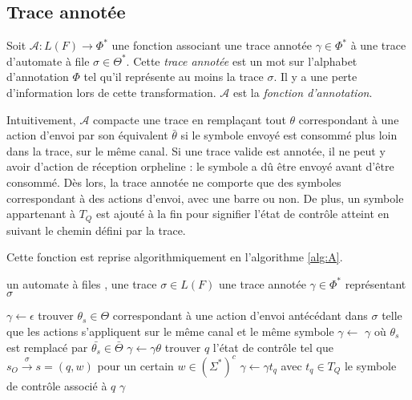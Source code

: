 
\subsection{Trace annotée}\label{trace:annot}

Soit $\mathcal{A}:L(F)\rightarrow\Phi^*$ une fonction associant une trace annotée $\gamma\in\Phi^*$ à une trace d'automate à file $\sigma\in\Theta^*$. Cette \emph{trace annotée} est un mot sur l'alphabet d'annotation $\Phi$ tel qu'il représente au moins la trace $\sigma$. Il y a une perte d'information lors de cette transformation. $\mathcal{A}$ est la \emph{fonction d'annotation}.

Intuitivement, $\mathcal{A}$ compacte une trace en remplaçant tout $\theta$ correspondant à une action d'envoi par son équivalent $\bar{\theta}$ si le symbole envoyé est consommé plus loin dans la trace, sur le même canal. Si une trace valide est annotée, il ne peut y avoir d'action de réception orpheline : le symbole a dû être envoyé avant d'être consommé. Dès lors, la trace annotée ne comporte que des symboles correspondant à des actions d'envoi, avec une barre ou non. De plus, un symbole appartenant à $T_Q$ est ajouté à la fin pour signifier l'état de contrôle atteint en suivant le chemin défini par la trace.

Cette fonction est reprise algorithmiquement en l'algorithme \ref{alg:A}.

\begin{algorithm}[H]
  	\begin{algorithmic}[1]
    \REQUIRE un automate à files \fifo , une trace $\sigma\in L(F)$
		\ENSURE une trace annotée $\gamma\in\Phi^*$ représentant $\sigma$

    \STATE $\gamma\leftarrow\epsilon$
        \STATE trouver $\theta_s\in\Theta$ correspondant à une action d'envoi antécédant dans $\sigma$ telle que les actions s'appliquent sur le même canal et le même symbole
        \STATE $\gamma\leftarrow$ $\gamma$ où $\theta_s$ est remplacé par $\bar{\theta_s}\in\bar{\Theta}$ 
        \STATE $\gamma\leftarrow\gamma\theta$
      \ENDIF
    \ENDFOR
    \STATE trouver $q$ l'état de contrôle tel que $s_O\xrightarrow{\sigma}s=(q,w)$ pour un certain $w\in(\Sigma^*)^c$
    \STATE $\gamma\leftarrow\gamma t_q$ avec $t_q\in T_Q$ le symbole de contrôle associé à $q$
		\RETURN $\gamma$
	\end{algorithmic}
	\caption{$\mathcal{A}:\Theta^*\rightarrow\Phi^*$}\label{alg:A}
\end{algorithm}

